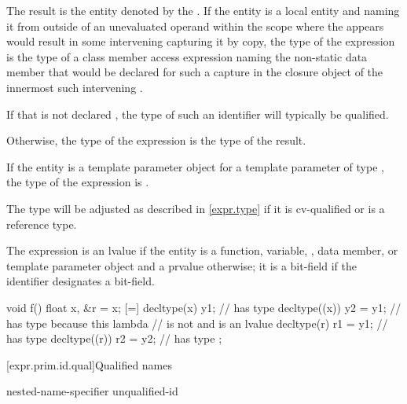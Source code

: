 \pnum
The result is the entity denoted by
the .
If the entity is a local entity
and naming it from outside of an unevaluated operand
within the scope where the  appears
would result in some intervening 
capturing it by copy,
the type of the expression is
the type of a class member access expression
naming the non-static data member
that would be declared for such a capture
in the closure object of
the innermost such intervening .
\begin{note}
If that  is not declared ,
the type of such an identifier will typically be  qualified.
\end{note}
Otherwise, the type of the expression is the type of the result.
\begin{note}
If the entity is a template parameter object for
a template parameter of type ,
the type of the expression is .
\end{note}
\begin{note}
The type will be adjusted as described in \ref{expr.type}
if it is cv-qualified or is a reference type.
\end{note}
The expression is an lvalue
if the entity is a function, variable, , data member, or
template parameter object
and a prvalue otherwise;
it is a bit-field if the identifier designates a bit-field.
\begin{example}
\begin{codeblock}
void f() {
  float x, &r = x;
  [=] {
    decltype(x) y1;             //  has type 
    decltype((x)) y2 = y1;      //  has type  because this lambda
                                // is not  and  is an lvalue
    decltype(r) r1 = y1;        //  has type 
    decltype((r)) r2 = y2;      //  has type 
  };
}
\end{codeblock}
\end{example}

[expr.prim.id.qual]{Qualified names}

%
%
%
\begin{bnf}
\br
    nested-name-specifier  unqualified-id
\end{bnf}

